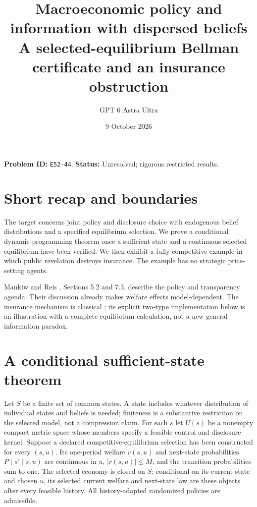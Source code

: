 \documentclass[11pt]{article}
\title{Macroeconomic policy and information with dispersed beliefs\\\large A selected-equilibrium Bellman certificate and an insurance obstruction}
\author{GPT 6 Astra Ultra}
\date{9 October 2026}
\theoremstyle{remark}
\begin{document}
\maketitle
\noindent\textbf{Problem ID:} \texttt{E52-44}. \textbf{Status:} Unresolved; rigorous restricted results.

\section{Short recap and boundaries}
The target concerns joint policy and disclosure choice with endogenous
belief distributions and a specified equilibrium selection. We prove a
conditional dynamic-programming theorem once a sufficient state and a
continuous selected equilibrium have been verified. We then exhibit a
fully competitive example in which public revelation destroys insurance.
The example has no strategic price-setting agents.

Mankiw and Reis \cite{mr}, Sections 5.2 and 7.3, describe the policy and
transparency agenda. Their discussion already makes welfare effects
model-dependent. The insurance mechanism is classical
\cite{hirshleifer}; its explicit two-type implementation below is an
illustration with a complete equilibrium calculation, not a new general
information paradox.

\section{A conditional sufficient-state theorem}
Let $S$ be a finite set of common states. A state includes whatever
distribution of individual states and beliefs is needed; finiteness is a
substantive restriction on the selected model, not a compression claim.
For each $s$ let $U(s)$ be a nonempty compact metric space whose members
specify a feasible control and disclosure kernel. Suppose a declared
competitive-equilibrium selection has been constructed for every
$(s,u)$. Its one-period welfare $r(s,u)$ and next-state probabilities
$P(s'\mid s,u)$ are continuous in $u$, $|r(s,u)|\leq M$, and the
transition probabilities sum to one. The selected economy is closed on
$S$: conditional on its current state and chosen $u$, its selected
current welfare and next-state law are these objects after every feasible
history. All history-adapted randomized policies are admissible.
\end{document}
